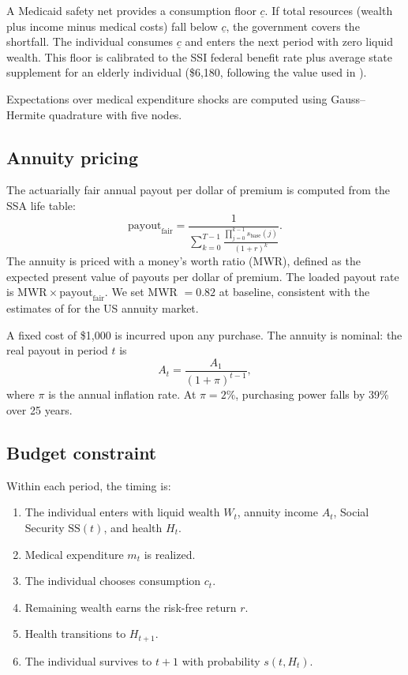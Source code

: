 \documentclass[12pt]{article}
\begin{document}
A Medicaid safety net provides a consumption floor $\underline{c}$. If total resources (wealth plus income minus medical costs) fall below $\underline{c}$, the government covers the shortfall. The individual consumes $\underline{c}$ and enters the next period with zero liquid wealth. This floor is calibrated to the SSI federal benefit rate plus average state supplement for an elderly individual (\$6,180, following the value used in \citealp{lockwood2012}).

Expectations over medical expenditure shocks are computed using Gauss--Hermite quadrature with five nodes.

\subsection{Annuity pricing}

The actuarially fair annual payout per dollar of premium is computed from the SSA life table:
\begin{equation}
\text{payout}_{\text{fair}} = \frac{1}{\sum_{k=0}^{T-1} \frac{\prod_{j=0}^{k-1} s_{\text{base}}(j)}{(1+r)^k}}.
\end{equation}
The annuity is priced with a money's worth ratio (MWR), defined as the expected present value of payouts per dollar of premium. The loaded payout rate is $\text{MWR} \times \text{payout}_{\text{fair}}$. We set MWR $= 0.82$ at baseline, consistent with the estimates of \citet{mitchell1999} for the US annuity market.

A fixed cost of \$1,000 is incurred upon any purchase. The annuity is nominal: the real payout in period $t$ is
\begin{equation}
A_t = \frac{A_1}{(1 + \pi)^{t-1}},
\end{equation}
where $\pi$ is the annual inflation rate. At $\pi = 2\%$, purchasing power falls by 39\% over 25 years.

\subsection{Budget constraint}

Within each period, the timing is:
\begin{enumerate}
\item The individual enters with liquid wealth $W_t$, annuity income $A_t$, Social Security $\text{SS}(t)$, and health $H_t$.
\item Medical expenditure $m_t$ is realized.
\item The individual chooses consumption $c_t$.
\item Remaining wealth earns the risk-free return $r$.
\item Health transitions to $H_{t+1}$.
\item The individual survives to $t+1$ with probability $s(t, H_t)$.
\end{enumerate}
\end{document}

